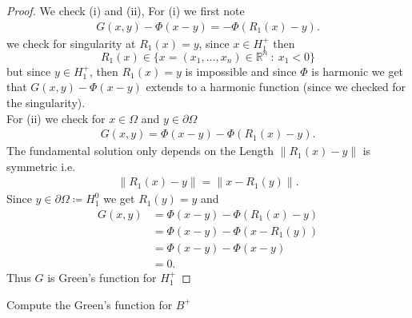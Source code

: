 \begin{proof}
 We check (i)  and (ii), For (i) we first note
 \begin{align*}
 G(x,y) - \Phi(x-y) =  -\Phi(R_1(x)-y)
 .\end{align*}
 we check for singularity at $R_1(x) = y$, since $x \in  H_1^{+} $ then 
 \[R_1(x) \in  \{x=(x_{1},\ldots ,x_n) \in  \mathbb{R}^{n} \ : \ x_{1}<0 \}  \]
 but since $y \in  H^{+}_1 $, then $R_1(x) = y$ is impossible and since $\Phi$ is harmonic we get that $G(x,y) - \Phi(x-y)$ extends to a harmonic function (since we checked for the singularity).\\
 For (ii) we check for $x \in  \Omega $ and $y \in  \partial \Omega $
 \begin{align*}
 G(x,y) = \Phi(x-y) - \Phi(R_{1}(x)-y) 
 .\end{align*}
 The fundamental solution only depends on the Length  $\|R_1(x)-y\|$ is symmetric i.e.
 \begin{align*}
  \|R_1(x) - y\| = \|x-R_1(y)\|
 .\end{align*}
 Since $y \in  \partial \Omega  \coloneqq  H_1^{0} $  we get $R_1(y) = y$ and 
  \begin{align*}
    G(x,y) &= \Phi(x-y) - \Phi(R_{1}(x)-y)  \\
           &= \Phi(x-y) - \Phi(x-R_1(y))  \\
           &= \Phi(x-y) - \Phi(x-y) \\
           &= 0
 .\end{align*}
 Thus $G$ is Green's function for $H_1^{+} $
\end{proof}
\begin{exercise}[c]
 Compute the Green's function for $B^{+} $
\end{exercise}
